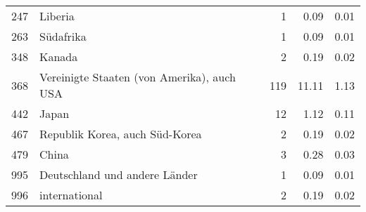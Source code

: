 \begin{longtable}{lXrrr}
        247 & \multicolumn{1}{X}{Liberia} & %
          \num{1} &
          \num[round-mode=places,round-precision=2]{0,09} &
          \num[round-mode=places,round-precision=2]{0,01} \\

        263 & \multicolumn{1}{X}{Südafrika} & %
          \num{1} &
          \num[round-mode=places,round-precision=2]{0,09} &
          \num[round-mode=places,round-precision=2]{0,01} \\

        348 & \multicolumn{1}{X}{Kanada} & %
          \num{2} &
          \num[round-mode=places,round-precision=2]{0,19} &
          \num[round-mode=places,round-precision=2]{0,02} \\

        368 & \multicolumn{1}{X}{Vereinigte Staaten (von Amerika), auch USA} & %
          \num{119} &
          \num[round-mode=places,round-precision=2]{11,11} &
          \num[round-mode=places,round-precision=2]{1,13} \\

        442 & \multicolumn{1}{X}{Japan} & %
          \num{12} &
          \num[round-mode=places,round-precision=2]{1,12} &
          \num[round-mode=places,round-precision=2]{0,11} \\

        467 & \multicolumn{1}{X}{Republik Korea, auch Süd-Korea} & %
          \num{2} &
          \num[round-mode=places,round-precision=2]{0,19} &
          \num[round-mode=places,round-precision=2]{0,02} \\

        479 & \multicolumn{1}{X}{China} & %
          \num{3} &
          \num[round-mode=places,round-precision=2]{0,28} &
          \num[round-mode=places,round-precision=2]{0,03} \\

        995 & \multicolumn{1}{X}{Deutschland und andere Länder} & %
          \num{1} &
          \num[round-mode=places,round-precision=2]{0,09} &
          \num[round-mode=places,round-precision=2]{0,01} \\

        996 & \multicolumn{1}{X}{international} & %
          \num{2} &
          \num[round-mode=places,round-precision=2]{0,19} &
          \num[round-mode=places,round-precision=2]{0,02} \\


\end{longtable}
